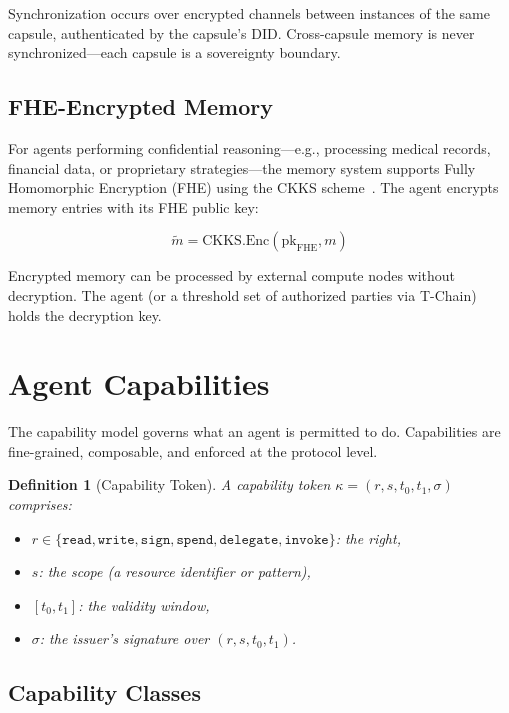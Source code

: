 \documentclass[11pt,a4paper]{article}
\newtheorem{definition}{Definition}
\begin{document}
Synchronization occurs over encrypted channels between instances of the same capsule, authenticated by the capsule's DID. Cross-capsule memory is never synchronized---each capsule is a sovereignty boundary.

\subsection{FHE-Encrypted Memory}

For agents performing confidential reasoning---e.g., processing medical records, financial data, or proprietary strategies---the memory system supports Fully Homomorphic Encryption (FHE) using the CKKS scheme~\cite{cheon2017ckks}. The agent encrypts memory entries with its FHE public key:

\begin{equation}\label{eq:fhe-memory}
    \tilde{m} = \text{CKKS.Enc}(\text{pk}_{\text{FHE}}, m)
\end{equation}

Encrypted memory can be processed by external compute nodes without decryption. The agent (or a threshold set of authorized parties via T-Chain) holds the decryption key.

\section{Agent Capabilities}\label{sec:capabilities}

The capability model governs what an agent is permitted to do. Capabilities are fine-grained, composable, and enforced at the protocol level.

\begin{definition}[Capability Token]
A capability token $\kappa = (r, s, t_0, t_1, \sigma)$ comprises:
\begin{itemize}
    \item $r \in \{\texttt{read}, \texttt{write}, \texttt{sign}, \texttt{spend}, \texttt{delegate}, \texttt{invoke}\}$: the right,
    \item $s$: the scope (a resource identifier or pattern),
    \item $[t_0, t_1]$: the validity window,
    \item $\sigma$: the issuer's signature over $(r, s, t_0, t_1)$.
\end{itemize}
\end{definition}

\subsection{Capability Classes}
\end{document}
